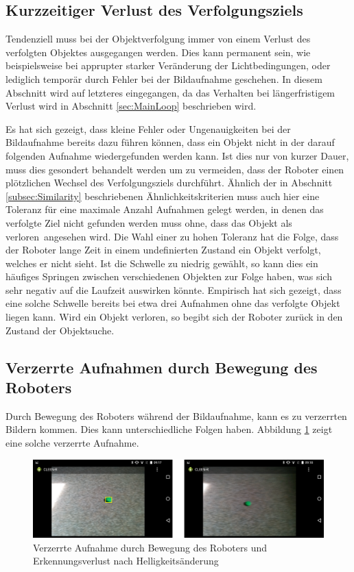 \subsection{Kurzzeitiger Verlust des Verfolgungsziels}

Tendenziell muss bei der Objektverfolgung immer von einem Verlust des verfolgten Objektes ausgegangen werden. Dies kann permanent sein, wie beispielsweise bei apprupter starker Veränderung der Lichtbedingungen, oder lediglich temporär durch Fehler bei der Bildaufnahme geschehen. In diesem Abschnitt wird auf letzteres eingegangen, da das Verhalten bei längerfristigem Verlust wird in Abschnitt \ref{sec:MainLoop} beschrieben wird.

Es hat sich gezeigt, dass kleine Fehler oder Ungenauigkeiten bei der Bildaufnahme bereits dazu führen können, dass ein Objekt nicht in der darauf folgenden Aufnahme wiedergefunden werden kann. Ist dies nur von kurzer Dauer, muss dies gesondert behandelt werden um zu vermeiden, dass der Roboter einen plötzlichen Wechsel des Verfolgungsziels durchführt. Ähnlich der in Abschnitt \ref{subsec:Similarity} beschriebenen Ähnlichkeitskriterien muss auch hier eine Toleranz für eine maximale Anzahl Aufnahmen gelegt werden, in denen das verfolgte Ziel nicht gefunden werden muss ohne, dass das Objekt als \glqq verloren\grqq\ angesehen wird. Die Wahl einer zu hohen Toleranz hat die Folge, dass der Roboter lange Zeit in einem undefinierten Zustand ein Objekt verfolgt, welches er nicht sieht. Ist die Schwelle zu niedrig gewählt, so kann dies ein häufiges Springen zwischen verschiedenen Objekten zur Folge haben, was sich sehr negativ auf die Laufzeit auswirken könnte. Empirisch hat sich gezeigt, dass eine solche Schwelle bereits bei etwa drei Aufnahmen ohne das verfolgte Objekt liegen kann. Wird ein Objekt verloren, so begibt sich der Roboter zurück in den Zustand der Objektsuche.


\subsection{Verzerrte Aufnahmen durch Bewegung des Roboters}

Durch Bewegung des Roboters während der Bildaufnahme, kann es zu verzerrten Bildern kommen. Dies kann unterschiedliche Folgen haben. Abbildung \ref{fig:Verzerrung} zeigt eine solche verzerrte Aufnahme. 

\begin{figure}[h]
\centering
\includegraphics[width=\textwidth]{Bilder/Workloop/ObjectLossOnMovement}
\caption{Verzerrte Aufnahme durch Bewegung des Roboters und Erkennungsverlust nach Helligkeitsänderung}
\label{fig:Verzerrung}
\end{figure}

